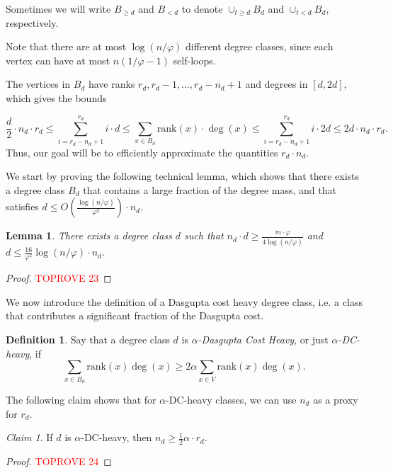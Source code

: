 \documentclass[letterpaper,11pt]{article}
\newcommand{\rank}{\mathrm{rank}}
\theoremstyle{plain}
\newtheorem{lemma}[theorem]{Lemma}
\theoremstyle{definition}
\newtheorem{definition}[theorem]{Definition}
\theoremstyle{remark}
\newtheorem{claim}{Claim}
\begin{document}
Sometimes we will write $B_{\geq d}$ and $B_{<d}$ to denote $\cup_{t \geq d} B_d$ and $\cup_{t < d} B_d$, respectively.

Note that there are at most $\log(n /\varphi)$ different degree classes, since each vertex can have at most $n(1/\varphi -1)$ self-loops. 

The vertices in $B_d$ have ranks $r_d, r_{d}-1,\dots, r_d -n_d+1$ and degrees in $[d,2d]$, which gives the bounds


\begin{equation}\label{eqn:rdnd}
    \frac{d}{2} \cdot n_d \cdot r_d \leq \sum_{i = r_d -n_d+1}^{r_d} i \cdot d \leq \sum_{x \in B_d} \rank(x) \cdot \deg(x) \leq \sum_{i = r_d -n_d+1}^{r_d} i \cdot 2d \leq 2 d \cdot n_d \cdot r_d.
\end{equation}
Thus, our goal will be to efficiently approximate the quantities $r_d \cdot n_d$.  

We start by proving the following technical lemma, which shows that there exists a degree class $B_d$ that contains a large fraction of the degree mass, 
and that satisfies $d \leq  O\left(\frac{\log(n/\varphi)}{\varphi^2}\right) \cdot n_d$. 
\begin{lemma}\label{lemma:heavy_and_good}
    There exists a degree class $d$ such that $n_d \cdot d \geq \frac{m \cdot \varphi}{4\log(n/\varphi)}$ and  $d \leq \frac{16}{\varphi^2} \log (n/\varphi) \cdot n_d.$
\end{lemma} 
\begin{proof}\textcolor{red}{TOPROVE 23}\end{proof}
We now introduce the definition of a Dasgupta cost heavy degree class, i.e. a class that contributes a significant fraction of the Dasgupta cost. 
\begin{definition}
    Say that a degree class $d$ is \emph{$\alpha$-Dasgupta Cost Heavy}, or just \emph{$\alpha$-DC-heavy}, if 
    \begin{equation*} \sum_{x\in B_d} \rank(x) \deg(x) \geq 2 \alpha \sum_{x\in V} \rank(x) \deg(x).\end{equation*} 
\end{definition}
The following claim shows that for $\alpha$-DC-heavy classes, we can use $n_d$ as a proxy for $r_d$. 
\begin{claim}\label{claim:rankbound}
    If $d$ is $\alpha$-DC-heavy, then $n_d \geq\frac{1}{2} \alpha \cdot r_d.$ 
\end{claim}
\begin{proof}\textcolor{red}{TOPROVE 24}\end{proof}
\end{document}
